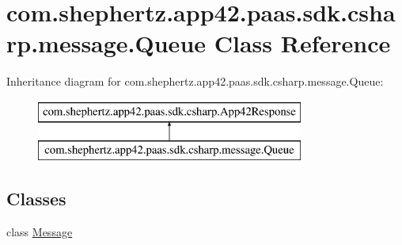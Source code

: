 \hypertarget{classcom_1_1shephertz_1_1app42_1_1paas_1_1sdk_1_1csharp_1_1message_1_1_queue}{\section{com.\+shephertz.\+app42.\+paas.\+sdk.\+csharp.\+message.\+Queue Class Reference}
\label{classcom_1_1shephertz_1_1app42_1_1paas_1_1sdk_1_1csharp_1_1message_1_1_queue}
}
Inheritance diagram for com.\+shephertz.\+app42.\+paas.\+sdk.\+csharp.\+message.\+Queue\+:\begin{figure}[H]
\begin{center}
\leavevmode
\includegraphics[height=2.000000cm]{classcom_1_1shephertz_1_1app42_1_1paas_1_1sdk_1_1csharp_1_1message_1_1_queue}
\end{center}
\end{figure}
\subsection*{Classes}
\begin{DoxyCompactItemize}
\item 
class \hyperlink{classcom_1_1shephertz_1_1app42_1_1paas_1_1sdk_1_1csharp_1_1message_1_1_queue_1_1_message}{Message}
\end{DoxyCompactItemize}
